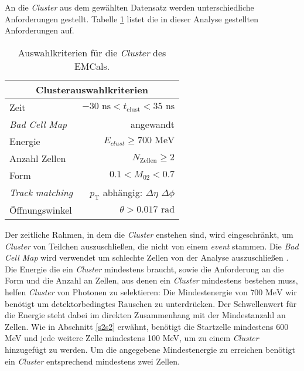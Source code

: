 An die \textit{Cluster} aus dem gewählten Datensatz werden unterschiedliche Anforderungen gestellt.
Tabelle \ref{tab:Cluster} listet die in dieser Analyse gestellten Anforderungen auf.
\begin{table}[b]
\centering
\begin{tabular}{|l|r|}
\hline
\multicolumn{2}{|c|}{Clusterauswahlkriterien}                   \\ \hline \hline
Zeit                    & $-30\text{ ns} < t_\text{clust}<35\text{ ns}$ \\ \hline
\textit{Bad Cell Map}   & angewandt                                     \\ \hline
Energie                 & $E_{clust}\geq700\text{ MeV}$                         \\ \hline
Anzahl Zellen           & $N_\text{Zellen}\geq 2$                       \\ \hline
Form                    & $0.1< M_{02}<0.7$                             \\ \hline
\textit{Track matching} & $p_\text{T}$ abhängig: $\Delta\eta$ $\Delta\phi$                                     \\ \hline
Öffnungswinkel          & $\theta>0.017\text{ rad}$                     \\ \hline
\end{tabular}
\caption{Auswahlkriterien für die \textit{Cluster} des EMCals.}
\label{tab:Cluster}
\end{table}
\newline
Der zeitliche Rahmen, in dem die \textit{Cluster} enstehen sind, wird eingeschränkt, um \textit{Cluster} von Teilchen auszuschließen, die nicht von einem \textit{event} stammen.
Die \textit{Bad Cell Map} wird verwendet um schlechte Zellen von der Analyse auszuschließen \cite{thesis:Joshua}.
\newline
Die Energie die ein \textit{Cluster} mindestens braucht, sowie die Anforderung an die Form und die Anzahl an Zellen, aus denen ein \textit{Cluster} mindestens bestehen muss, helfen \textit{Cluster} von Photonen zu selektieren:
Die Mindestenergie von $700\text{ MeV}$ wir benötigt um detektorbedingtes  Rauschen zu unterdrücken.
Der Schwellenwert für die Energie steht dabei im direkten Zusammenhang mit der Mindestanzahl an Zellen.
Wie in Abschnitt \ref{s2s2} erwähnt, benötigt die Startzelle mindestens 600 MeV und jede weitere Zelle mindestens 100 MeV, um zu einem \textit{Cluster} hinzugefügt zu werden.
Um die angegebene Mindestenergie zu erreichen benötigt ein \textit{Cluster} entsprechend mindestens zwei Zellen.
